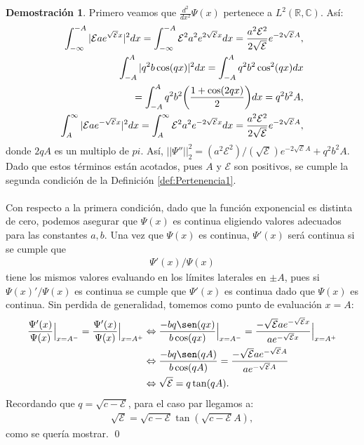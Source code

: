 \documentclass[12pt]{article}
\theoremstyle{definition}
\newtheorem*{demo}{Demostración}
\newcommand*{\field}[1]{\mathbb{#1}}
\begin{document}
\begin{demo}
Primero veamos que $\frac{d^{2}}{dx^{2}}\Psi(x)$ pertenece a $L^{2}(\field{R},\field{C})$. Así:
\begin{align}
    \int_{-\infty}^{-A}|\mathcal{E}ae^{\sqrt{\mathcal{E}}x}|^{2} dx = 
    \int_{-\infty}^{-A} \mathcal{E}^2a^{2}e^{2\sqrt{\mathcal{E}}x}dx = \frac{a^2\mathcal{E}^2}{2\sqrt{\mathcal{E}}}e^{-2\sqrt{\mathcal{E}}A},
    \notag
    \\
    \int_{-A}^{A}|q^2b\cos(qx)|^{2} dx =  \int_{-A}^{A}q^2b^{2}\cos^{2}(qx) dx 
    \notag
    \\ = \int_{-A}^{A}q^2b^{2}\bigg(\frac{1+\cos(2qx)}{2}\bigg)dx = q^2b^{2}A,
    \notag
    \\ \int_{A}^{\infty} |\mathcal{E}ae^{-\sqrt{\mathcal{E}}x}|^{2} dx = \int_{A}^{\infty} \mathcal{E}^2a^{2}e^{-2\sqrt{\mathcal{E}}x}dx = \frac{a^2\mathcal{E}^2}{2\sqrt{\mathcal{E}}}e^{-2\sqrt{\mathcal{E}}A},
    \label{eq:Desarrollos}
\end{align}
donde $2qA$ es un multiplo de $pi$. Así,
$||\Psi''||_{2}^{2} = (a^2\mathcal{E}^2)/(\sqrt{\mathcal{E}})e^{-2\sqrt{\mathcal{E}}A}+q^2b^2A$.
Dado que estos términos están acotados, pues $A$ y $\mathcal{E}$ son positivos, se cumple la segunda condición de la Definición \ref{def:Pertenencia1}. \\ \\
Con respecto a la primera condición, dado que la función exponencial es distinta de cero, podemos asegurar que $\Psi(x)$ es continua eligiendo valores adecuados para las constantes $a,b$. Una vez que $\Psi(x)$ es continua, $\Psi'(x)$ será continua si se cumple que
\begin{align*}
     \Psi'(x)/\Psi(x)
\end{align*}
 tiene los mismos valores evaluando en los límites laterales en $\pm A$, pues si $\Psi(x)'/\Psi(x)$ es continua se cumple que $\Psi'(x)$ es continua dado que $\Psi(x)$ es continua. Sin perdida de generalidad, tomemos como punto de evaluación $x=A$:
\begin{align*}
     \frac{\Psi'(x)}{\Psi(x)}\Big|_{x=A^{-}} =
    \frac{\Psi'(x)}{\Psi(x)}\Big|_{x=A^{+}}  &
     \Leftrightarrow
     \frac{-bq\sen(qx)}{b\cos(qx)} \Big|_{x=A^{-}} = 
    \frac{-\sqrt{\mathcal{E}}ae^{-\sqrt{\mathcal{E}}x}}{ae^{-\sqrt{\mathcal{E}}x}}\Big|_{x=A^{+}}
    \\
    & \Leftrightarrow
    \frac{-bq\sen(qA)}{b\cos(qA)} 
     = 
    \frac{-\sqrt{\mathcal{E}}ae^{-\sqrt{\mathcal{E}}A}}{ae^{-\sqrt{\mathcal{E}}A}}
    \\
    &
    \Leftrightarrow
    \sqrt{\mathcal{E}} = q\tan(qA).
\end{align*}
Recordando que $q=\sqrt{c-\mathcal{E}}$, para el caso par llegamos a:
\begin{align*}
    \sqrt{\mathcal{E}} = \sqrt{c-\mathcal{E}}\tan(\sqrt{c-\mathcal{E}}A),
\end{align*}
como se quería mostrar.
\qed
\end{demo}
\end{document}
